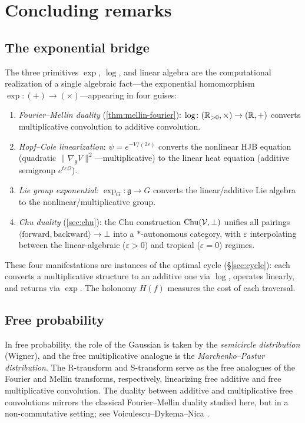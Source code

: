 \section{Concluding remarks}\label{sec:concluding}

\subsection*{The exponential bridge}

The three primitives $\exp$, $\log$, and linear algebra are
the computational realization of a single algebraic
fact---the exponential homomorphism
$\exp\colon (+) \to (\times)$---appearing in four guises:
\begin{enumerate}[label=\textup{(\arabic*)}]
\item \emph{Fourier--Mellin duality}
      (\cref{thm:mellin-fourier}):
      $\log\colon (\mathbb{R}_{>0}, \times) \to (\mathbb{R}, +)$ converts
      multiplicative convolution to additive convolution.
\item \emph{Hopf--Cole linearization}:
      $\psi = e^{-V/(2\varepsilon)}$ converts the nonlinear HJB
      equation (quadratic
      $\|\nabla_{\mathfrak{g}} V\|^2$---multiplicative)
      to the linear heat equation (additive semigroup
      $e^{t\varepsilon\Omega}$).
\item \emph{Lie group exponential}:
      $\exp_G\colon \mathfrak{g} \to G$ converts the
      linear/additive Lie algebra to the nonlinear/multiplicative
      group.
\item \emph{Chu duality} (\cref{sec:chu}):
      the Chu construction $\mathrm{Chu}(\mathcal{V}, \bot)$ unifies all
      pairings
      $\langle\text{forward},\text{backward}\rangle \to \bot$
      into a $*$-autonomous category, with $\varepsilon$
      interpolating between the linear-algebraic
      ($\varepsilon > 0$) and tropical ($\varepsilon = 0$) regimes.
\end{enumerate}
These four manifestations are instances of the optimal cycle (\S\ref{sec:cycle}): each converts a multiplicative structure to an additive one via $\log$, operates linearly, and returns via $\exp$. The holonomy $H(f)$ measures the cost of each traversal.

\subsection*{Free probability}
In free probability, the role of the Gaussian is taken by the \emph{semicircle distribution} (Wigner), and the free multiplicative analogue is the \emph{Marchenko--Pastur distribution}. The R-transform and S-transform serve as the free analogues of the Fourier and Mellin transforms, respectively, linearizing free additive and free multiplicative convolution. The duality between additive and multiplicative free convolutions mirrors the classical Fourier--Mellin duality studied here, but in a non-commutative setting; see Voiculescu--Dykema--Nica \cite{VDN}.

